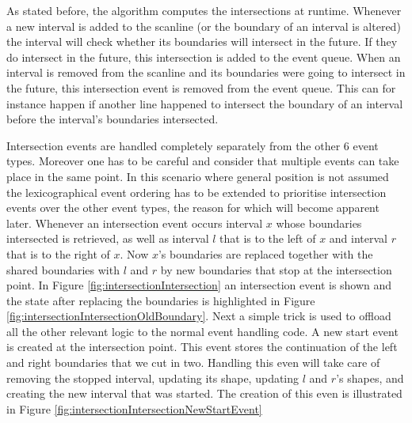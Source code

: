 \documentclass[12pt]{article}
\begin{document}
As stated before, the algorithm computes the intersections at runtime. Whenever a new interval is added to the scanline (or the boundary of an interval is altered) the interval will check whether its boundaries will intersect in the future. If they do intersect in the future, this intersection is added to the event queue. When an interval is removed from the scanline and its boundaries were going to intersect in the future, this intersection event is removed from the event queue. This can for instance happen if another line happened to intersect the boundary of an interval before the interval's boundaries intersected. 

Intersection events are handled completely separately from the other 6 event types. Moreover one has to be careful and consider that multiple events can take place in the same point. In this scenario where general position is not assumed the lexicographical event ordering has to be extended to prioritise intersection events over the other event types, the reason for which will become apparent later. Whenever an intersection event occurs interval $x$ whose boundaries intersected is retrieved, as well as interval $l$ that is to the left of $x$ and interval $r$ that is to the right of $x$. Now $x$'s boundaries are replaced together with the shared boundaries with $l$ and $r$ by new boundaries that stop at the intersection point. In Figure \ref{fig:intersectionIntersection} an intersection event is shown and the state after replacing the boundaries is highlighted in Figure \ref{fig:intersectionIntersectionOldBoundary}. Next a simple trick is used to offload all the other relevant logic to the normal event handling code. A new start event is created at the intersection point. This event stores the continuation of the left and right boundaries that we cut in two. Handling this even will take care of removing the stopped interval, updating its shape, updating $l$ and $r$'s shapes, and creating the new interval that was started. The creation of this even is illustrated in Figure \ref{fig:intersectionIntersectionNewStartEvent}
\end{document}
